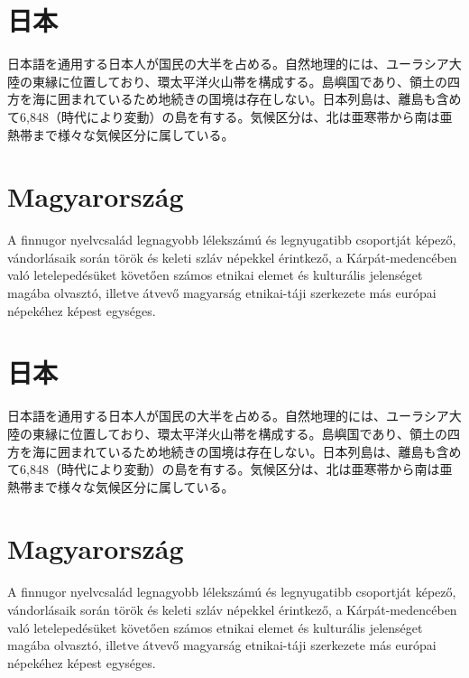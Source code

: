 \documentclass{book}
\begin{document}
\tableofcontents

\chapter{日本}

日本語を通用する日本人が国民の大半を占める。自然地理的には、ユーラシア大陸の東縁に位置しており、環太平洋火山帯を構成する。島嶼国であり、領土の四方を海に囲まれているため地続きの国境は存在しない。日本列島は、離島も含めて6,848（時代により変動）の島を有する。気候区分は、北は亜寒帯から南は亜熱帯まで様々な気候区分に属している。


\chapter{Magyarország}

A finnugor nyelvcsalád legnagyobb lélekszámú és legnyugatibb csoportját
képező, vándorlásaik során török és keleti szláv népekkel érintkező, a
Kárpát-medencében való letelepedésüket követően számos etnikai elemet
és kulturális jelenséget magába olvasztó, illetve átvevő magyarság
etnikai-táji szerkezete más európai népekéhez képest egységes.


\appendix

\chapter{日本}

日本語を通用する日本人が国民の大半を占める。自然地理的には、ユーラシア大陸の東縁に位置しており、環太平洋火山帯を構成する。島嶼国であり、領土の四方を海に囲まれているため地続きの国境は存在しない。日本列島は、離島も含めて6,848（時代により変動）の島を有する。気候区分は、北は亜寒帯から南は亜熱帯まで様々な気候区分に属している。


\chapter{Magyarország}

A finnugor nyelvcsalád legnagyobb lélekszámú és legnyugatibb csoportját
képező, vándorlásaik során török és keleti szláv népekkel érintkező, a
Kárpát-medencében való letelepedésüket követően számos etnikai elemet
és kulturális jelenséget magába olvasztó, illetve átvevő magyarság
etnikai-táji szerkezete más európai népekéhez képest egységes.
\end{document}
